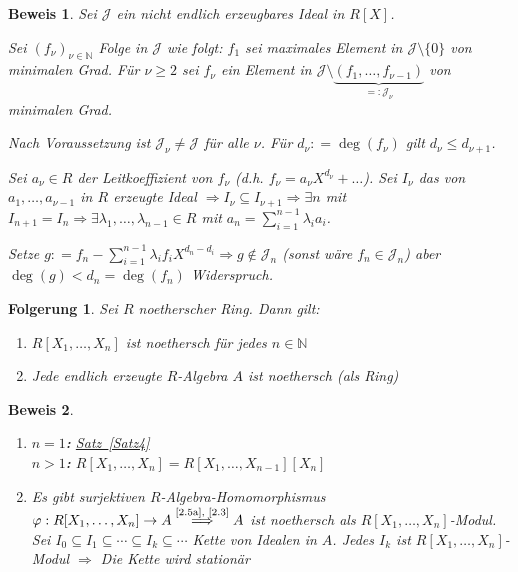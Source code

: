 \documentclass[a4paper,12pt]{scrbook}
\theoremstyle{break}
\newtheorem{Folg}[Def]{Folgerung}
\theoremstyle{nonumberbreak}
\newtheorem{Bew}{Beweis}
\theoremstyle{nonumberplain}
\newcommand{\defeqr}[0]{\mathrel{\mathop:}=}
\newcommand{\defeql}[0]{=\mathrel{\mathop:}}
\newcommand{\myref}[2]{%
\hyperref[#2]{#1~\ref*{#2}}%
}
\begin{document}
\begin{Bew} 
  Sei $\mathcal{J}$ ein nicht endlich erzeugbares Ideal in $R[X]$.

  Sei $(f_{\nu})_{\nu \in \mathbb{N}}$ Folge in $\mathcal{J}$ wie folgt:
  $f_1$ sei maximales Element in $\mathcal{J} \setminus \{0\}$ von minimalen
  Grad. Für $\nu \ge 2$ sei $f_{\nu}$ ein Element in $\mathcal{J} \setminus
  \underset{\defeql \mathcal{J}_{\nu}}{\underbrace{(f_1, \dots , f_{\nu - 1})}}$
  von minimalen Grad.

  Nach Voraussetzung ist $\mathcal{J}_{\nu} \not= \mathcal{J}$ für alle $\nu$.
  Für $d_{\nu} \defeqr \deg(f_{\nu})$ gilt $d_{\nu} \le d_{\nu + 1}$.

  Sei $a_{\nu} \in R$ der Leitkoeffizient von $f_{\nu}$ (d.h. $f_{\nu} =
  a_{\nu} X^{d_{\nu}} + \dots$). Sei $I_{\nu}$ das von $a_1, \dots , a_{\nu -1}$
  in $R$ erzeugte Ideal $\Rightarrow I_{\nu} \subseteq I_{\nu + 1} \Rightarrow
  \exists n$ mit $I_{n+1} = I_n \Rightarrow \exists \lambda_1, \dots ,
  \lambda_{n-1} \in R$ mit $a_n = \sum_{i=1}^{n-1} \lambda_i a_i$.

  Setze $g \defeqr f_n - \sum_{i=1}^{n-1} \lambda_i f_i X^{d_n - d_i}
  \Rightarrow g \notin \mathcal{J}_n$ (sonst wäre $f_n \in \mathcal{J}_n$) aber
  $\deg(g) < d_n = \deg(f_n)$ Widerspruch.
\end{Bew}

\begin{Folg} 
  Sei $R$ noetherscher Ring. Dann gilt:
  \begin{enumerate}
    \item \label{2.5a} $R[X_1, \dots , X_n]$ ist noethersch für jedes $n \in
    \mathbb{N}$
    \item Jede endlich erzeugte $R$-Algebra $A$ ist noethersch (als Ring)
  \end{enumerate}
\end{Folg}

\begin{Bew} 
  \begin{enumerate} 
    \item
      \textbf{$n=1$:} \myref{Satz}{Satz4}\\
      \textbf{$n>1$:} $R[X_1, \dots , X_n] = R[X_1, \dots , X_{n-1}][X_n]$
    \item Es gibt surjektiven $R$-Algebra-Homomorphismus $\varphi: R[X_1, \dots
      , X_n] \to A \overset{\text{\ref{2.5a}, \ref{2.3}}}{\Longrightarrow} A$ ist noethersch als $R[X_1, \dots ,
      X_n]$-Modul. Sei $I_0 \subseteq I_1 \subseteq \cdots \subseteq I_k \subseteq
      \cdots$ Kette von Idealen in $A$. Jedes $I_k$ ist $R[X_1, \dots ,
      X_n]$-Modul $\Rightarrow$ Die Kette wird stationär
\end{enumerate}
\end{Bew}
\end{document}
